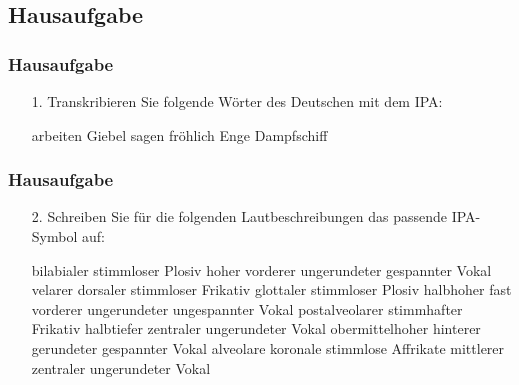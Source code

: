 \subsection{Hausaufgabe}

\begin{frame}
\frametitle{Hausaufgabe}

\begin{itemize}
	\item[1.] Transkribieren Sie folgende Wörter des Deutschen mit dem IPA:

	\begin{exe}
		\ex \label{ex:02HA1}
		\begin{xlist}
			\ex arbeiten
			\ex Giebel
			\ex sagen
			\ex fröhlich
			\ex Enge
			\ex Dampfschiff
		\end{xlist}
	\end{exe}

\end{itemize}

\end{frame}	


\begin{frame}
\frametitle{Hausaufgabe}

\begin{itemize}
	\item[2.] {Schreiben Sie für die folgenden Lautbeschreibungen das passende IPA-Symbol auf:}

 \begin{exe}
	 \ex \label{ex:02HA2}
 	\begin{xlist}
		\ex bilabialer stimmloser Plosiv
		\ex hoher vorderer ungerundeter gespannter Vokal
		\ex velarer dorsaler stimmloser Frikativ
		\ex  glottaler stimmloser Plosiv
		\ex  halbhoher fast vorderer ungerundeter ungespannter Vokal
		\ex  postalveolarer stimmhafter Frikativ
		\ex  halbtiefer zentraler ungerundeter Vokal
		\ex  obermittelhoher hinterer gerundeter gespannter Vokal
		\ex  alveolare koronale stimmlose Affrikate
		\ex  mittlerer zentraler ungerundeter Vokal
	\end{xlist}
\end{exe}
\end{itemize}

\end{frame}


